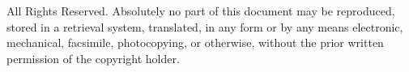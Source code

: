 \documentclass[oneside, 12pt]{book}
\begin{document}
\noindent All Rights Reserved. Absolutely no part of this document may
be reproduced, stored in a retrieval system, translated, in any form
or by any means electronic, mechanical, facsimile, photocopying, or
otherwise, without the prior written permission of the copyright
holder.

\vspace*{\fill}




\newcommand{\centeringrule}[2]{%
  \hspace{\fill}%
  \rule{#1}{#2}%
  \hspace{\fill}%
}

\end{document}
